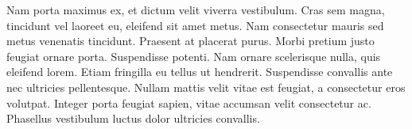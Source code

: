 Nam porta maximus ex, et dictum velit viverra vestibulum. Cras sem magna, tincidunt vel laoreet eu, eleifend sit amet metus. Nam consectetur mauris sed metus venenatis tincidunt. Praesent at placerat purus. Morbi pretium justo feugiat ornare porta. Suspendisse potenti. Nam ornare scelerisque nulla, quis eleifend lorem. Etiam fringilla eu tellus ut hendrerit. Suspendisse convallis ante nec ultricies pellentesque. Nullam mattis velit vitae est feugiat, a consectetur eros volutpat. Integer porta feugiat sapien, vitae accumsan velit consectetur ac. Phasellus vestibulum luctus dolor ultricies convallis.